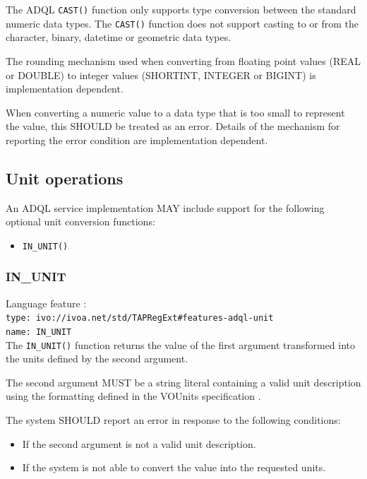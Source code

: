 \documentclass[11pt,a4paper]{ivoa}
\begin{document}
The ADQL \verb:CAST(): function only supports type conversion between the
standard numeric data types. The \verb:CAST(): function does not support
casting to or from the character, binary, datetime or geometric data types.

The rounding mechanism used when converting from floating point values
(REAL or DOUBLE) to integer values (SHORTINT, INTEGER or BIGINT) is
implementation dependent.

When converting a numeric value to a data type that is too small to represent
the value, this SHOULD be treated as an error.
Details of the mechanism for reporting the error condition are
implementation dependent.

\subsection{Unit operations}
\label{sec:unit}

An ADQL service implementation MAY include support for the following optional
unit conversion functions:

\begin{itemize}
    \item \verb:IN_UNIT():
\end{itemize}

\subsubsection{IN\_UNIT}
\label{sec:unit.cast}
{\footnotesize Language feature :}\\
{\footnotesize \verb|type: ivo://ivoa.net/std/TAPRegExt#features-adql-unit|}\\
{\footnotesize \verb|name: IN_UNIT|}\\

The \verb:IN_UNIT(): function returns the value of the first argument
transformed into the units defined by the second argument.

The second argument MUST be a string literal containing a valid unit
description using the formatting defined in the VOUnits specification \citep{std:VOUNIT}.

The system SHOULD report an error in response to the following conditions:
\begin{itemize}
    \item If the second argument is not a valid unit description. 
    \item If the system is not able to convert the value into the requested units.
\end{itemize}
\end{document}
